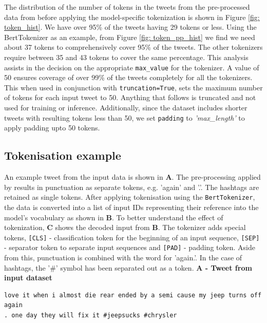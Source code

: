 The distribution of the number of tokens in the tweets from the pre-processed data from \cite{preotiuc-pietro_automatically_2019,jinModelingSeverityComplaints2021} before applying the model-specific tokenization is shown in Figure \ref{fig: token_hist}. We have over 95\% of the tweets having 29 tokens or less. Using the BertTokenizer as an example, from Figure \ref{fig: token_pp_hist} we find we need about 37 tokens to comprehensively cover 95\% of the tweets. The other tokenizers require between 35 and 43 tokens to cover the same percentage. This analysis assists in the decision on the appropriate \texttt{max\_value} for the tokenizer. A value of 50 ensures coverage of over 99\% of the tweets completely for all the tokenizers. This when used in conjunction with \texttt{truncation=True}, sets the maximum number of tokens for each input tweet to 50. Anything that follows is truncated and not used for training or inference. Additionally, since the dataset includes shorter tweets with resulting tokens less than 50, we set \texttt{padding} to \emph{'max\_length'} to apply padding upto 50 tokens.


\subsection{Tokenisation example}
An example tweet from the input data is shown in \textbf{A}. The pre-processing applied by \cite{preotiuc-pietro_automatically_2019,jinModelingSeverityComplaints2021} results in punctuation as separate tokens, e.g. 'again' and '.'. The hashtags are retained as single tokens. After applying tokenisation using the \texttt{BertTokenizer}, the data is converted into a list of input IDs representing their reference into the model's vocabulary as shown in \textbf{B}. To better understand the effect of tokenization, \textbf{C} shows the decoded input from \textbf{B}. The tokenizer adds special tokens, \texttt{[CLS]} - classification token for the beginning of an input sequence, \texttt{[SEP]} - separator token to separate input sequences and \texttt{[PAD]} - padding token. Aside from this, punctuation is combined with the word for 'again.'. In the case of hashtags, the '\#' symbol has been separated out as a token.\newline\newline
\textbf{A - Tweet from input dataset}\newline

\begin{adjustbox}{minipage={\textwidth},fbox}
    \begin{verbatim}love it when i almost die rear ended by a semi cause my jeep turns off again 
. one day they will fix it #jeepsucks #chrysler\end{verbatim}
\end{adjustbox} \newline\newline

